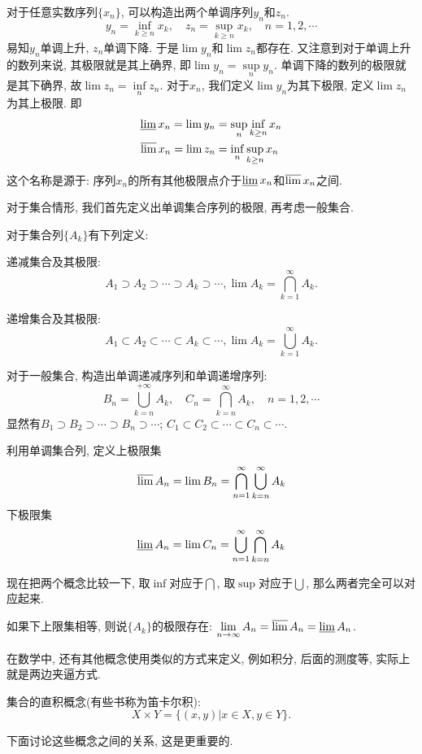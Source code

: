 \documentclass[12pt,a4paper,openany]{book}
\begin{document}
对于任意实数序列$\{x_n\}$, 可以构造出两个单调序列$y_n$和$z_n$.
$$
y_n = \inf_{k \ge n}{x_k}, \quad z_n = \sup_{k \ge n}{x_k}, \quad n = 1, 2, \cdots
$$
易知$y_n$单调上升, $z_n$单调下降. 于是$\lim{y_n}$和$\lim{z_n}$都存在. 又注意到对于单调上升的数列来说, 其极限就是其上确界, 即$\lim{y_n} = \sup\limits_{n}{y_n}$. 单调下降的数列的极限就是其下确界, 故$\lim{z_n} = \inf\limits_{n}{z_n}$. 对于$x_n$, 我们定义$\lim{y_n}$为其下极限, 定义$\lim{z_n}$为其上极限. 即
$$
\begin{aligned}
\varliminf{x_n} = \lim{y_n} &= \sup\limits_{n}{\inf\limits_{k \ge n}{x_n}} \\
\varlimsup{x_n} = \lim{z_n} &= \inf\limits_{n}{\sup\limits_{k \ge n}{x_n}}
\end{aligned}
$$
这个名称是源于: 序列$x_n$的所有其他极限点介于$\varliminf{x_n}$和$\varlimsup{x_n}$之间.

对于集合情形, 我们首先定义出单调集合序列的极限, 再考虑一般集合.

对于集合列$\{A_k\}$有下列定义:

递减集合及其极限: 
$$
A_1 \supset A_2 \supset \cdots \supset A_k \supset \cdots, \lim{A_k} = \bigcap_{k=1}^{\infty}{A_k}.
$$

递增集合及其极限:
$$
A_1 \subset A_2 \subset \cdots \subset A_k \subset \cdots, \lim{A_k} = \bigcup_{k=1}^{\infty}{A_k}.
$$

对于一般集合, 构造出单调递减序列和单调递增序列:
$$
B_n = \bigcup_{k=n}^{+\infty}{A_k}, \quad C_n = \bigcap_{k=n}^{\infty}{A_k}, \quad n = 1, 2, \cdots
$$
显然有$B_1 \supset B_2 \supset \cdots \supset B_n \supset \cdots$; $C_1 \subset C_2 \subset \cdots \subset C_n \subset \cdots$.

利用单调集合列, 定义上极限集
$$
\varlimsup{A_n} = \lim{B_n} = \bigcap_{n=1}^{\infty}{\bigcup_{k=n}^{\infty}{A_k}}
$$
下极限集
$$
\varliminf{A_n} = \lim{C_n} = \bigcup_{n=1}^{\infty}{\bigcap_{k=n}^{\infty}{A_k}}
$$

现在把两个概念比较一下, 取$\inf$对应于$\bigcap$, 取$\sup$对应于$\bigcup$, 那么两者完全可以对应起来.

如果下上限集相等, 则说$\{A_k\}$的极限存在: $\lim\limits_{n \rightarrow \infty}{A_n} = \varlimsup{A_n} = \varliminf{A_n}$.

在数学中, 还有其他概念使用类似的方式来定义, 例如积分, 后面的测度等, 实际上就是两边夹逼方式.

集合的直积概念(有些书称为笛卡尔积):
$$
X \times Y = \{(x, y) | x \in X, y \in Y \}.
$$

下面讨论这些概念之间的关系, 这是更重要的.
\end{document}

